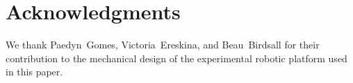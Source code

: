 \documentclass[lettersize,journal,twoside]{IEEEtran}
\theoremstyle{definition}
\begin{document}




 





{\small
\section*{Acknowledgments}
\noindent
We thank Paedyn~Gomes, Victoria~Ereskina, and Beau~Birdsall for their contribution to the mechanical design of the experimental robotic platform used in this paper.

}
\end{document}
